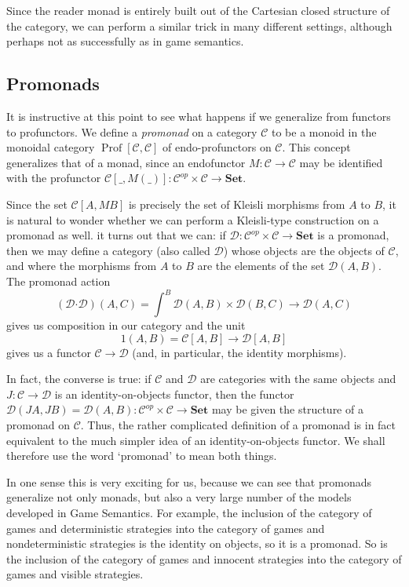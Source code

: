 \documentclass{svproc}
\newcommand\C{\mathcal{C}}
\newcommand\D{\mathcal{D}}
\newcommand{\pfc}{\boldsymbol{\cdot}}
\newcommand*\from{\colon}
\newcommand{\0}{{\mathtt{0}}} \newcommand{\com}{{\mathtt{com}}}
\newcommand{\catname}[1]{\mathbf{#1}}
\newcommand{\Set}{\catname{Set}}
\DeclareMathOperator{\Prof}{Prof}
\begin{document}
Since the reader monad is entirely built out of the Cartesian closed structure of the category, we can perform a similar trick in many different settings, although perhaps not as successfully as in game semantics.  

\subsection{Promonads}

It is instructive at this point to see what happens if we generalize from functors to profunctors.  
We define a \emph{promonad} on a category $\C$ to be a monoid in the monoidal category $\Prof[\C,\C]$ of endo-profunctors on $\C$.  
This concept generalizes that of a monad, since an endofunctor $M\from \C\to\C$ may be identified with the profunctor $\C[\_,M(\_)]\from \C^{op}\times\C\to\Set$.

Since the set $\C[A,MB]$ is precisely the set of Kleisli morphisms from $A$ to $B$, it is natural to wonder whether we can perform a Kleisli-type construction on a promonad as well.  
it turns out that we can: if $\D\from \C^{op}\times\C\to\Set$ is a promonad, then we may define a category (also called $\D$) whose objects are the objects of $\C$, and where the morphisms from $A$ to $B$ are the elements of the set $\D(A,B)$.
The promonad action
\[
  (\D\pfc\D)(A,C) = \int^{B}\D(A,B)\times\D(B,C) \to \D(A,C)
  \]
gives us composition in our category and the unit
\[
  1(A,B)=\C[A,B]\to \D[A,B]
  \]
gives us a functor $\C\to\D$ (and, in particular, the identity morphisms).

In fact, the converse is true: if $\C$ and $\D$ are categories with the same objects and $J\from \C\to\D$ is an identity-on-objects functor, then the functor $\D(JA,JB)=\D(A,B)\from\C^{op}\times\C\to\Set$ may be given the structure of a promonad on $\C$.  
Thus, the rather complicated definition of a promonad is in fact equivalent to the much simpler idea of an identity-on-objects functor.
We shall therefore use the word `promonad' to mean both things.

In one sense this is very exciting for us, because we can see that promonads generalize not only monads, but also a very large number of the models developed in Game Semantics.  
For example, the inclusion of the category of games and deterministic strategies into the category of games and nondeterministic strategies is the identity on objects, so it is a promonad.  
So is the inclusion of the category of games and innocent strategies into the category of games and visible strategies.  
\end{document}
